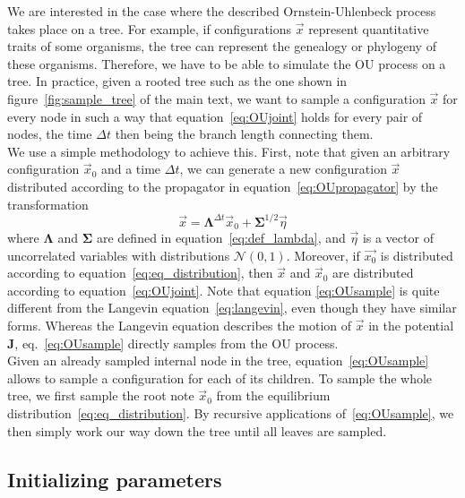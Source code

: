 \documentclass[preprint,amsmath,amssymb,superscriptaddress,showpacs,pre]{revtex4-1}
\def\vx{\vec x}
\newcommand{\Lam}{\bm{\Lambda}}
\newcommand{\Sig}{\bm{\Sigma}}
\begin{document}
	We are interested in the case where the described Ornstein-Uhlenbeck process takes place on a tree. 
	For example, if configurations $\vec{x}$ represent quantitative traits of some organisms, the tree can represent the genealogy or phylogeny of these organisms. 
	Therefore, we have to be able to simulate the OU process on a tree. 
	In practice, given a rooted tree such as the one shown in figure~\ref{fig:sample_tree} of the main text, we want to sample a configuration $\vec{x}$ for every node in such a way that equation~\ref{eq:OUjoint} holds for every pair of nodes, the time $\Delta t$ then being the branch length connecting them. \\
	We use a simple methodology to achieve this. 
	First, note that given an arbitrary configuration $\vec{x}_0$ and a time $\Delta t$, we can generate a new configuration $\vec{x}$ distributed according to the propagator in equation~\ref{eq:OUpropagator} by the transformation
	\begin{equation}
		\vx = \Lam^{\Delta t}\vx_0 + \Sig^{1/2}\vec{\eta}
		\label{eq:OUsample}
	\end{equation}
	where $\Lam$ and $\Sig$ are defined in equation~\ref{eq:def_lambda}, and $\vec{\eta}$ is a vector of uncorrelated variables with distributions $\mathcal{N}(0,1)$. 
	Moreover, if $\vec{x_0}$ is distributed according to equation~\ref{eq:eq_distribution}, then $\vx$ and $\vx_0$ are distributed according to equation~\ref{eq:OUjoint}. 
	Note that equation \ref{eq:OUsample} is quite different from the Langevin equation~\ref{eq:langevin}, even though they have similar forms. 
	Whereas the Langevin equation describes the motion of $\vx$ in the potential $\bm{J}$, eq.~\ref{eq:OUsample} directly samples from the OU process. \\
	Given an already sampled internal node in the tree, equation~\ref{eq:OUsample} allows to sample a configuration for each of its children. 
	To sample the whole tree, we first sample the root note $\vx_0$ from the equilibrium distribution~\ref{eq:eq_distribution}. 
	By recursive applications of~\ref{eq:OUsample}, we then simply work our way down the tree until all leaves are sampled.  



\subsection{Initializing parameters} %
\label{sub:initializing_parameters}
\end{document}
